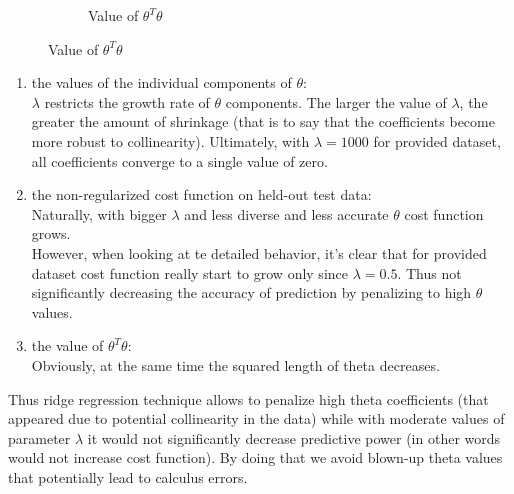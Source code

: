 \documentclass{article}
\begin{document}
\begin{enumerate}
\begin{figure}[h]
\begin{subfigure}{.48\textwidth}
				\caption{Value of $\theta^T \theta$}	
			\end{subfigure}
		\end{figure}	
		\begin{enumerate}		
		\item the values of the individual components of $\theta$:\\
			$\lambda$ restricts the growth rate of $\theta$ components. The larger the value of $\lambda$, the greater the amount of shrinkage (that is to say that the coefficients become more robust to collinearity). Ultimately, with $\lambda=1000$ for provided dataset, all coefficients converge to a single value of zero. 
		
		\item the non-regularized cost function on held-out test data:\\
			Naturally, with bigger $\lambda$ and less diverse and less accurate $\theta$ cost function grows.\\
			However, when looking at te detailed behavior, it's clear that for provided dataset cost function really start to grow only since $\lambda=0.5$. Thus not significantly decreasing the accuracy of prediction by penalizing to high $\theta$ values.
		\item the value of $\theta^T \theta$:\\
			Obviously, at the same time the squared length of theta decreases.
		\end{enumerate}
		
		Thus ridge regression technique allows to penalize high theta coefficients (that appeared due to potential collinearity in the data) while with moderate values of parameter $\lambda$ it would not significantly decrease predictive power (in other words would not increase cost function). By doing that we avoid blown-up theta values that potentially lead to calculus errors. 
	\end{enumerate}

\pagebreak	
\end{document}
